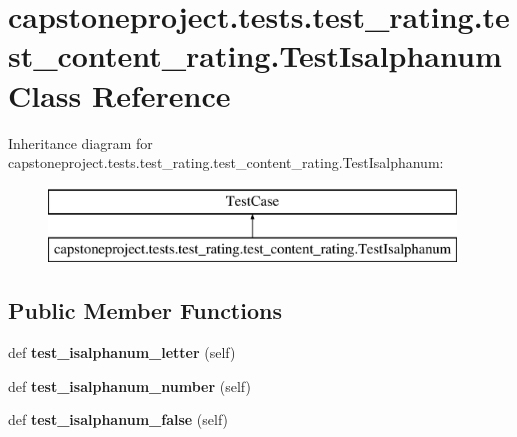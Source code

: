 \hypertarget{classcapstoneproject_1_1tests_1_1test__rating_1_1test__content__rating_1_1_test_isalphanum}{}\section{capstoneproject.\+tests.\+test\+\_\+rating.\+test\+\_\+content\+\_\+rating.\+Test\+Isalphanum Class Reference}
\label{classcapstoneproject_1_1tests_1_1test__rating_1_1test__content__rating_1_1_test_isalphanum}
Inheritance diagram for capstoneproject.\+tests.\+test\+\_\+rating.\+test\+\_\+content\+\_\+rating.\+Test\+Isalphanum\+:\begin{figure}[H]
\begin{center}
\leavevmode
\includegraphics[height=2.000000cm]{classcapstoneproject_1_1tests_1_1test__rating_1_1test__content__rating_1_1_test_isalphanum}
\end{center}
\end{figure}
\subsection*{Public Member Functions}
\begin{DoxyCompactItemize}
\item 
\mbox{\label{classcapstoneproject_1_1tests_1_1test__rating_1_1test__content__rating_1_1_test_isalphanum_ad4a204b123874083b8908b84e100616b}} 
def {\bfseries test\+\_\+isalphanum\+\_\+letter} (self)
\item 
\mbox{\label{classcapstoneproject_1_1tests_1_1test__rating_1_1test__content__rating_1_1_test_isalphanum_a0074829bfdf0b96ad0ddd2e71eb37cda}} 
def {\bfseries test\+\_\+isalphanum\+\_\+number} (self)
\item 
\mbox{\label{classcapstoneproject_1_1tests_1_1test__rating_1_1test__content__rating_1_1_test_isalphanum_aad9428e512c6ac6eb18a1a7c77b82904}} 
def {\bfseries test\+\_\+isalphanum\+\_\+false} (self)
\end{DoxyCompactItemize}


